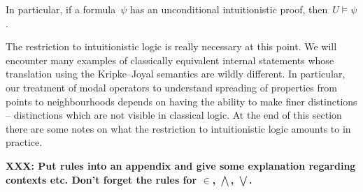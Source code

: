 \documentclass[10pt]{amsart}
\theoremstyle{definition}
\theoremstyle{plain}
\theoremstyle{remark}
\newcommand{\?}{\,{:}\,}
\renewcommand{\_}{\mathpunct{.}\,}
\newcommand{\XXX}[1]{\textbf{XXX: #1}}
\begin{document}
In particular, if a formula~$\psi$ has an unconditional intuitionistic proof,
then~$U \models \psi$.

The restriction to intuitionistic logic is really necessary at this point. We
will encounter many examples of classically equivalent internal statements whose
translation using the Kripke--Joyal semantics are wildly different. In
particular, our treatment of modal operators to understand spreading of
properties from points to neighbourhoods depends on having the ability to make
finer distinctions -- distinctions which are not visible in classical logic.
At the end of this section there are some notes on what the restriction to
intuitionistic logic amounts to in practice.

\XXX{Put rules into an appendix and give some explanation regarding contexts
etc. Don't forget the rules for $\in$, $\bigwedge$, $\bigvee$.}
\end{document}
